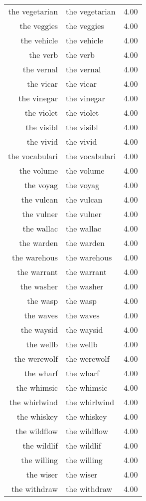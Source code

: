 \begin{table}[ht]
\begin{tabular}{rlr}
  the vegetarian & the vegetarian & 4.00 \\ 
  the veggies & the veggies & 4.00 \\ 
  the vehicle & the vehicle & 4.00 \\ 
  the verb & the verb & 4.00 \\ 
  the vernal & the vernal & 4.00 \\ 
  the vicar & the vicar & 4.00 \\ 
  the vinegar & the vinegar & 4.00 \\ 
  the violet & the violet & 4.00 \\ 
  the visibl & the visibl & 4.00 \\ 
  the vivid & the vivid & 4.00 \\ 
  the vocabulari & the vocabulari & 4.00 \\ 
  the volume & the volume & 4.00 \\ 
  the voyag & the voyag & 4.00 \\ 
  the vulcan & the vulcan & 4.00 \\ 
  the vulner & the vulner & 4.00 \\ 
  the wallac & the wallac & 4.00 \\ 
  the warden & the warden & 4.00 \\ 
  the warehous & the warehous & 4.00 \\ 
  the warrant & the warrant & 4.00 \\ 
  the washer & the washer & 4.00 \\ 
  the wasp & the wasp & 4.00 \\ 
  the waves & the waves & 4.00 \\ 
  the waysid & the waysid & 4.00 \\ 
  the wellb & the wellb & 4.00 \\ 
  the werewolf & the werewolf & 4.00 \\ 
  the wharf & the wharf & 4.00 \\ 
  the whimsic & the whimsic & 4.00 \\ 
  the whirlwind & the whirlwind & 4.00 \\ 
  the whiskey & the whiskey & 4.00 \\ 
  the wildflow & the wildflow & 4.00 \\ 
  the wildlif & the wildlif & 4.00 \\ 
  the willing & the willing & 4.00 \\ 
  the wiser & the wiser & 4.00 \\ 
  the withdraw & the withdraw & 4.00 \\ 

\end{tabular}
\end{table}
